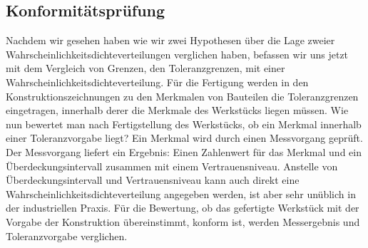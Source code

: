\subsection{Konformitätsprüfung}
Nachdem wir gesehen haben wie wir zwei Hypothesen über die Lage zweier Wahrscheinlichkeitsdichteverteilungen
verglichen haben, befassen wir uns jetzt mit dem Vergleich von Grenzen, den Toleranzgrenzen, mit einer
Wahrscheinlichkeitsdichteverteilung. Für die Fertigung werden in den Konstruktionszeichnungen zu den Merkmalen
von Bauteilen die Toleranzgrenzen eingetragen, innerhalb derer die Merkmale des Werkstücks liegen müssen. Wie nun
bewertet man nach Fertigstellung des Werkstücks, ob ein Merkmal innerhalb einer Toleranzvorgabe liegt? Ein Merkmal
wird durch einen Messvorgang geprüft. Der Messvorgang liefert ein Ergebnis: Einen Zahlenwert für das Merkmal und
ein Überdeckungsintervall zusammen mit einem Vertrauensniveau. Anstelle von Überdeckungsintervall und Vertrauensniveau
kann auch direkt eine Wahrscheinlichkeitsdichteverteilung angegeben werden, ist aber sehr unüblich in der industriellen
Praxis. Für die Bewertung, ob das gefertigte Werkstück mit der Vorgabe der Konstruktion übereinstimmt, konform ist,
werden Messergebnis und Toleranzvorgabe verglichen.

